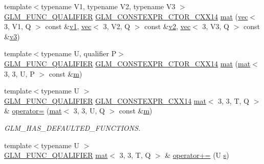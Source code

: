 \begin{DoxyCompactItemize}
\item 
{\footnotesize template$<$typename V1, typename V2, typename V3 $>$ }\\\hyperlink{setup_8hpp_a33fdea6f91c5f834105f7415e2a64407}{G\+L\+M\+\_\+\+F\+U\+N\+C\+\_\+\+Q\+U\+A\+L\+I\+F\+I\+ER} \hyperlink{setup_8hpp_a0900f9145e68bf6061b6f5e7be3fa751}{G\+L\+M\+\_\+\+C\+O\+N\+S\+T\+E\+X\+P\+R\+\_\+\+C\+T\+O\+R\+\_\+\+C\+X\+X14} \hyperlink{structglm_1_1mat_3_013_00_013_00_01_t_00_01_q_01_4_a4795e853feaed2593cdee9e041da1f58}{mat} (\hyperlink{structglm_1_1vec}{vec}$<$ 3, V1, Q $>$ const \&\hyperlink{_s_d_l__opengl__glext_8h_a435c176a02c061b43e19bdf7c86cceae}{v1}, \hyperlink{structglm_1_1vec}{vec}$<$ 3, V2, Q $>$ const \&\hyperlink{_s_d_l__opengl__glext_8h_a0928f6d0f0f794ba000a21dfae422136}{v2}, \hyperlink{structglm_1_1vec}{vec}$<$ 3, V3, Q $>$ const \&\hyperlink{_s_d_l__opengl__glext_8h_acc806b31cbf466ceba6555983d8b814d}{v3})
\item 
{\footnotesize template$<$typename U, qualifier P$>$ }\\\hyperlink{setup_8hpp_a33fdea6f91c5f834105f7415e2a64407}{G\+L\+M\+\_\+\+F\+U\+N\+C\+\_\+\+Q\+U\+A\+L\+I\+F\+I\+ER} \hyperlink{setup_8hpp_a0900f9145e68bf6061b6f5e7be3fa751}{G\+L\+M\+\_\+\+C\+O\+N\+S\+T\+E\+X\+P\+R\+\_\+\+C\+T\+O\+R\+\_\+\+C\+X\+X14} \hyperlink{structglm_1_1mat_3_013_00_013_00_01_t_00_01_q_01_4_ad2ae09a7a8a55aa735691eaf3dad3e0f}{mat} (\hyperlink{structglm_1_1mat}{mat}$<$ 3, 3, U, P $>$ const \&\hyperlink{_s_d_l__opengl__glext_8h_af593500c283bf1a787a6f947f503a5c2}{m})
\item 
{\footnotesize template$<$typename U $>$ }\\\hyperlink{setup_8hpp_a33fdea6f91c5f834105f7415e2a64407}{G\+L\+M\+\_\+\+F\+U\+N\+C\+\_\+\+Q\+U\+A\+L\+I\+F\+I\+ER} \hyperlink{setup_8hpp_a4dd12abf5e1164bc57f3a34671d03844}{G\+L\+M\+\_\+\+C\+O\+N\+S\+T\+E\+X\+P\+R\+\_\+\+C\+X\+X14} \hyperlink{structglm_1_1mat}{mat}$<$ 3, 3, T, Q $>$ \& \hyperlink{structglm_1_1mat_3_013_00_013_00_01_t_00_01_q_01_4_aec5bce9abbb6bbe0b55fbec3b8c01098}{operator=} (\hyperlink{structglm_1_1mat}{mat}$<$ 3, 3, U, Q $>$ const \&\hyperlink{_s_d_l__opengl__glext_8h_af593500c283bf1a787a6f947f503a5c2}{m})
\begin{DoxyCompactList}\small\item\em G\+L\+M\+\_\+\+H\+A\+S\+\_\+\+D\+E\+F\+A\+U\+L\+T\+E\+D\+\_\+\+F\+U\+N\+C\+T\+I\+O\+NS. \end{DoxyCompactList}\item 
{\footnotesize template$<$typename U $>$ }\\\hyperlink{setup_8hpp_a33fdea6f91c5f834105f7415e2a64407}{G\+L\+M\+\_\+\+F\+U\+N\+C\+\_\+\+Q\+U\+A\+L\+I\+F\+I\+ER} \hyperlink{structglm_1_1mat}{mat}$<$ 3, 3, T, Q $>$ \& \hyperlink{structglm_1_1mat_3_013_00_013_00_01_t_00_01_q_01_4_a599b3db0f60dfda57462529ad4406ba8}{operator+=} (U \hyperlink{_s_d_l__opengl_8h_a4af680a6c683f88ed67b76f207f2e6e4}{s})

\end{DoxyCompactItemize}
